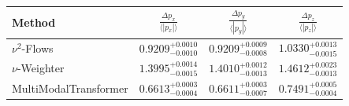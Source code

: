     \begin{tabular}{lccc}
        \toprule
        Method & $\frac{\Delta p_x}{\langle |p_x|\rangle}$ & $\frac{\Delta p_y}{\langle |p_y|\rangle}$ & $\frac{\Delta p_z}{\langle |p_z|\rangle}$ \\
        \midrule
        $\nu^2$-Flows & $0.9209^{+0.0010}_{-0.0010}$ & $0.9209^{+0.0009}_{-0.0008}$ & $1.0330^{+0.0013}_{-0.0015}$ \\
        $\nu$-Weighter & $1.3995^{+0.0014}_{-0.0015}$ & $1.4010^{+0.0012}_{-0.0013}$ & $1.4612^{+0.0023}_{-0.0013}$ \\
        MultiModalTransformer & $0.6613^{+0.0003}_{-0.0004}$ & $0.6611^{+0.0003}_{-0.0007}$ & $0.7491^{+0.0005}_{-0.0004}$ \\
        \bottomrule
    \end{tabular}